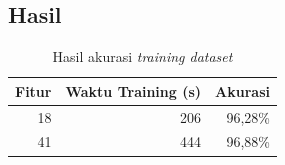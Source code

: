 \subsection{Hasil}
\FloatBarrier
\begin{table}[h]
\begin{tabular}{|r|r|r|}
\hline
\multicolumn{1}{|l|}{Fitur} & \multicolumn{1}{l|}{Waktu Training (s)} & \multicolumn{1}{l|}{Akurasi} \\  \hline
18                          & 206                                     & 96,28\%                      \\ \hline
41                          & 444                                     & 96,88\%                      \\ \hline
\end{tabular}
\centering
\caption{Hasil akurasi \textit{training dataset}}
\end{table}
\FloatBarrier

